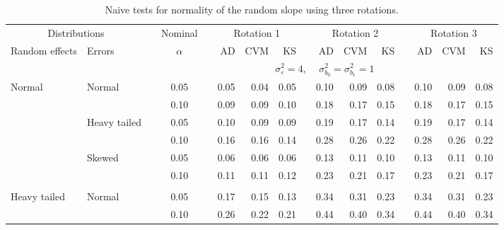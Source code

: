 \documentclass{article} %
\begin{document}
\begin{table}[ht]
\begin{scriptsize}
\begin{center}
\begin{tabular}{ll p{.1cm} c p{.1cm} rrr p{.1cm} rrr p{.1cm} rrr}
   \hline
\end{tabular}
\end{center}
\end{scriptsize}
\end{table}



\begin{table}[ht]
\caption{Naive tests for normality of the random slope using three rotations.}
\begin{scriptsize}
\begin{center}
\begin{tabular}{ll p{.1cm} c p{.1cm} rrr p{.1cm} rrr p{.1cm} rrr}
  \hline
  \multicolumn{2}{c}{Distributions}& & Nominal & &  \multicolumn{3}{c}{Rotation 1} & & \multicolumn{3}{c}{Rotation 2} & & \multicolumn{3}{c}{Rotation 3}\\ \cline{1-2} \cline{6-8} \cline{10-12} \cline{14-16}
  Random effects & Errors & & $\alpha$ & & AD & CVM & KS & & AD & CVM & KS & & AD & CVM & KS \\ 
   \hline
& && && \multicolumn{9}{c}{$\sigma_{\varepsilon}^2 = 4$, \ \ $\sigma_{b_0}^2 = \sigma_{b_1}^2 = 1$} \\ \cline{6-16}
\rowcolor{gray!20}Normal       & Normal       && 0.05 &&   0.05 & 0.04 & 0.05 && 0.10 & 0.09 & 0.08 && 0.10 & 0.09 & 0.08 \\ 
\rowcolor{gray!20}             &              && 0.10 &&   0.09 & 0.09 & 0.10 && 0.18 & 0.17 & 0.15 && 0.18 & 0.17 & 0.15 \\ 
\rowcolor{gray!20}             & Heavy tailed && 0.05 &&   0.10 & 0.09 & 0.09 && 0.19 & 0.17 & 0.14 && 0.19 & 0.17 & 0.14 \\ 
\rowcolor{gray!20}             &              && 0.10 &&   0.16 & 0.16 & 0.14 && 0.28 & 0.26 & 0.22 && 0.28 & 0.26 & 0.22 \\ 
\rowcolor{gray!20}             & Skewed       && 0.05 &&   0.06 & 0.06 & 0.06 && 0.13 & 0.11 & 0.10 && 0.13 & 0.11 & 0.10 \\ 
\rowcolor{gray!20}             &              && 0.10 &&   0.11 & 0.11 & 0.12 && 0.23 & 0.21 & 0.17 && 0.23 & 0.21 & 0.17 \\ 
             &&&&&&&&&&&&&&&\\
Heavy tailed & Normal       && 0.05 &&   0.17 & 0.15 & 0.13 && 0.34 & 0.31 & 0.23 && 0.34 & 0.31 & 0.23 \\ 
             &              && 0.10 &&   0.26 & 0.22 & 0.21 && 0.44 & 0.40 & 0.34 && 0.44 & 0.40 & 0.34 \\ 

\end{tabular}
\end{center}
\end{scriptsize}
\end{table}
\end{document}

